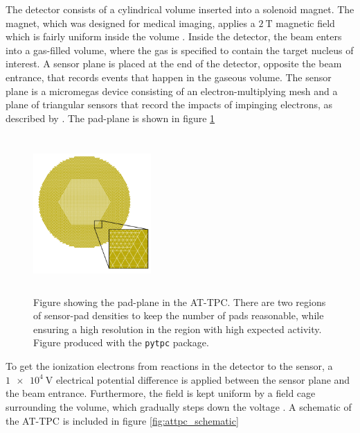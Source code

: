  The detector consists of a cylindrical volume inserted into a solenoid magnet. The magnet, which was designed for medical imaging, applies a $\SI{2}{\tesla}$ magnetic field which is fairly uniform inside the volume \cite{Bradt2017a}. Inside the detector, the beam enters into a gas-filled volume, where the gas is specified to contain the target nucleus of interest. A sensor plane is placed at the end of the detector, opposite the beam entrance, that records events that happen in the gaseous volume. The sensor plane is a micromegas device consisting of an electron-multiplying mesh and a plane of triangular sensors that record the impacts of impinging electrons, as described by \citet{Giomataris1996}. The pad-plane is shown in figure \ref{fig:attpc_padplane}

 \begin{figure}
\centering
\includegraphics[width=0.4\textwidth, height=6cm]{../plots/at_tpc_padplane}
\caption{Figure showing the pad-plane in the AT-TPC. There are two regions of sensor-pad densities to keep the number of pads reasonable, while ensuring a high resolution in the region with high expected activity. Figure produced with the \lstinline{pytpc} package.}\label{fig:attpc_padplane}
 \end{figure}

 To get the ionization electrons from reactions in the detector to the sensor, a $\SI{1e4}{\volt}$ electrical potential difference is applied between the sensor plane and the beam entrance. Furthermore, the field is kept uniform by a field cage surrounding the volume, which gradually steps down the voltage \cite{Bradt2017a}. A schematic of the AT-TPC is included in figure \ref{fig:attpc_schematic}

